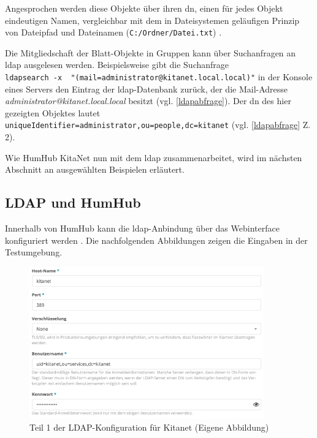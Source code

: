 Angesprochen werden diese Objekte über ihren \ac{dn}, einen für jedes Objekt eindeutigen Namen, vergleichbar mit dem in Dateisystemen geläufigen Prinzip von Dateipfad und Dateinamen (\zb \verb+C:/Ordner/Datei.txt+) \citep[vgl.][613]{Deimeke2019}. 

Die Mitgliedschaft der Blatt-Objekte in Gruppen kann über Suchanfragen an \ac{ldap} ausgelesen werden. Beispielsweise gibt die Suchanfrage\\ \verb+ldapsearch -x  "(mail=administrator@kitanet.local.local)"+ in der Konsole eines Servers den Eintrag der \ac{ldap}-Datenbank zurück, der die Mail-Adresse \textit{administrator@kitanet.local.local} besitzt (vgl. \autoref{ldapabfrage}). Der \ac{dn} des hier gezeigten Objektes lautet \\ \verb+uniqueIdentifier=administrator,ou=people,dc=kitanet+ (vgl. \autoref{ldapabfrage} Z. 2).

Wie HumHub \bzw KitaNet nun mit dem \ac{ldap} zusammenarbeitet, wird im nächsten Abschnitt an ausgewählten Beispielen erläutert.

\subsection{LDAP und HumHub}

Innerhalb von HumHub kann die \ac{ldap}-Anbindung über das Webinterface konfiguriert werden \citep[vgl.][]{humldap}. Die nachfolgenden Abbildungen zeigen die Eingaben in der Testumgebung. 

\begin{figure}[H]
  \centering
  \includegraphics[width=0.9\textwidth]{res/ldapkitanet1.png}
  \caption{Teil 1 der LDAP-Konfiguration für Kitanet (Eigene Abbildung)}
  \label{fig:LDAP Kitanet Teil 1}
\end{figure}

